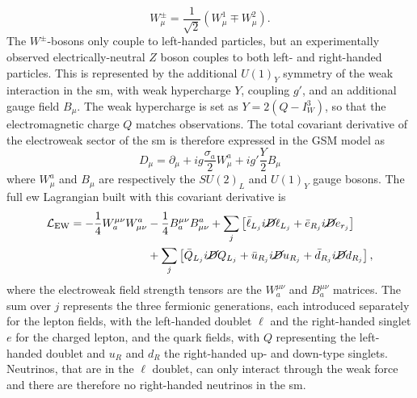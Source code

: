\begin{equation}\label{eq-weak-lic}
    W_{\mu}^{\pm} = \frac{1}{\sqrt{2}} \left(W_{\mu}^{1} \mp W_{\mu}^{2} \right).
\end{equation}
The $W^{\pm}$-bosons only couple to left-handed particles, but an experimentally observed electrically-neutral $Z$ boson couples to both left- and right-handed particles. This is represented by the additional $U(1)_Y$ symmetry of the weak interaction in the \gls{sm}, with weak hypercharge $Y$, coupling $g'$, and an additional gauge field $B_{\mu}$. The weak hypercharge is set as $Y = 2 (Q - I_W^3)$, so that the electromagnetic charge $Q$ matches observations. The total covariant derivative of the electroweak sector of the \gls{sm} is therefore expressed in the GSM model as 
\begin{equation}\label{eq-GaugeEW}
    D_{\mu}  = \partial_{\mu} + ig \frac{\sigma_a}{2} W_{\mu}^a + ig' \frac{Y}{2} B_{\mu}
\end{equation}
where $W_{\mu}^a$ and $B_{\mu}$ are respectively the $SU(2)_L$ and $U(1)_Y$ gauge bosons. The full \gls{ew} Lagrangian built with this covariant derivative is
\begin{equation}\label{eq-EWlag}
    \begin{split}
        \mathcal{L}_{\text{EW}} = - \frac{1}{4} W_a^{\mu\nu} W^a_{\mu\nu} &- \frac{1}{4} B_a^{\mu\nu} B^a_{\mu\nu} + \sum_{j} \left[ \bar{\ell}_{L_j}i\cancel{D}\ell_{L_j} + \bar{e}_{R_j}i\cancel{D}e_{r_j}  \right] \\
        &+ \sum_{j} \left[ \bar{Q}_{L_j}i\cancel{D}Q_{L_j} + \bar{u}_{R_j}i\cancel{D}u_{R_j} + \bar{d}_{R_j}i\cancel{D}d_{R_j} \right],
    \end{split}
\end{equation}
where the electroweak field strength tensors are the $W_a^{\mu\nu}$ and $B_a^{\mu\nu}$ matrices. The sum over $j$ represents the three fermionic generations, each introduced separately for the lepton fields, with the left-handed doublet $\ell$ and the right-handed singlet $e$ for the charged lepton, and the quark fields, with $Q$ representing the left-handed doublet and $u_R$ and $d_R$ the right-handed up- and down-type singlets. Neutrinos, that are in the $\ell$ doublet, can only interact through the weak force and there are therefore no right-handed neutrinos in the \gls{sm}. \\

